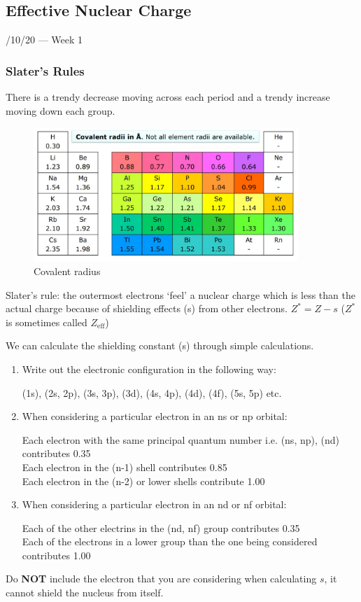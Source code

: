 \documentclass{article}
\newcommand{\thedate}[1]{\hfill{\small\sc #1}}
\newcommand{\NB}{{\large\lefthand}\quad}
\begin{document}
    \subsection{Effective Nuclear Charge}\thedate{28/10/20 --- Week 1}
    \subsubsection{Slater's Rules}
    There is a trendy decrease moving across each period and a trendy increase moving down each group.
    \begin{figure}[h]
        \centering
        \includegraphics[width=10cm]{covrad.jpg}
        \caption{Covalent radius}
    \end{figure}

    Slater's rule: the outermost electrons `feel' a nuclear charge which is less than the actual charge because
    of shielding effects (s) from other electrons. \(Z^* = Z - s\) (\(Z^*\) is sometimes called \(Z_{\text{eff}}\))

    We can calculate the shielding constant (s) through simple calculations. 
    \begin{enumerate}
        \item Write out the electronic configuration in the following way:
        
        (1s), (2s, 2p), (3s, 3p), (3d), (4s, 4p), (4d), (4f), (5s, 5p) etc.

        \item When considering a particular electron in an ns or np orbital:
        
        Each electron with the same principal quantum number i.e. (ns, np), (nd) contributes 0.35\\
        Each electron in the (n-1) shell contributes 0.85\\
        Each electron in the (n-2) or lower shells contribute 1.00 

        \item When considering a particular electron in an nd or nf orbital:
        
        Each of the other electrins in the (nd, nf) group contributes 0.35\\
        Each of the electrons in a lower group than the one being considered contributes 1.00\\
    \end{enumerate}
    \NB Do \textbf{NOT} include the electron that you are considering when calculating \(s\), it cannot shield the
    nucleus from itself.
\end{document}
